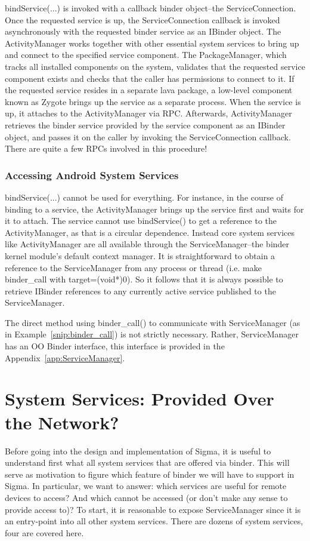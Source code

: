 \documentclass[prodmode]{acmlarge}
\begin{document}
bindService(...) is invoked with a callback binder object--the ServiceConnection. Once the requested service is up, the ServiceConnection callback is invoked asynchronously with the requested binder service as an IBinder object. The ActivityManager works together with other essential system services to bring up and connect to the specified service component. The PackageManager, which tracks all installed components on the system, validates that the requested service component exists and checks that the caller has permissions to connect to it. If the requested service resides in a separate lava package, a low-level component known as Zygote brings up the service as a separate process. When the service is up, it attaches to the ActivityManager via RPC. Afterwards, ActivityManager retrieves the binder service provided by the service component as an IBinder object, and passes it on the caller by invoking the ServiceConnection callback. There are quite a few RPCs involved in this procedure!

\subsubsection{Accessing Android System Services}
bindService(...) cannot be used for everything. For instance, in the course of binding to a service, the ActivityManager brings up the service first and waits for it to attach. The service cannot use bindService() to get a reference to the ActivityManager, as that is a circular dependence. Instead core system services like ActivityManager are all available through the ServiceManager--the binder kernel module's default context manager. It is straightforward to obtain a reference to the ServiceManager from any process or thread (i.e. make binder\_call with target=(void*)0). So it follows that it is always possible to retrieve IBinder references to any currently active service published to the ServiceManager.

The direct method using binder\_call() to communicate with ServiceManager (as in Example~\ref{snip:binder_call}) is not strictly necessary. Rather, ServiceManager has an OO Binder interface, this interface is provided in the Appendix~\ref{app:ServiceManager}. 

\section{System Services: Provided Over the Network?}
\label{sec:SystemServices}
Before going into the design and implementation of Sigma, it is useful to understand first what all system services that are offered via binder. This will serve as motivation to figure which feature of binder we will have to support in Sigma. In particular, we want to answer: which services are useful for remote devices to access? And which cannot be accessed (or don't make any sense to provide access to)?  To start, it is reasonable to expose ServiceManager since it is an entry-point into all other system services. There are dozens of system services, four are covered here.
\end{document}
